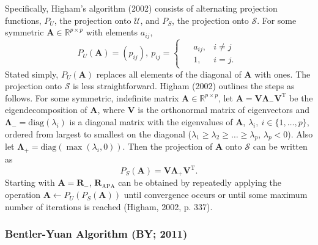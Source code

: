 \documentclass[
  english,
  man]{apa6}
\begin{document}
Specifically, Higham's algorithm (2002) consists of alternating projection functions, \(P_U\), the projection onto \(\mathcal{U}\), and \(P_S\), the projection onto \(\mathcal{S}\). For some symmetric \(\mathbf{A} \in \mathbb{R}^{p \times p}\) with elements \(a_{ij}\),
\begin{equation}
P_U(\mathbf{A}) = (p_{ij}), \: p_{ij} = 
\begin{cases}
\begin{aligned}
&a_{ij}, &i \neq j \\
&1, &i = j.
\end{aligned}
\end{cases}
\label{eq:proj-U}
\end{equation}
Stated simply, \(P_U(\mathbf{A})\) replaces all elements of the diagonal of \(\mathbf{A}\) with ones. The projection onto \(\mathcal{S}\) is less straightforward. Higham (2002) outlines the steps as follows. For some symmetric, indefinite matrix \(\mathbf{A} \in \mathbb{R}^{p \times p}\), let \(\mathbf{A} = \mathbf{V} \mathbf{\Lambda}_- \mathbf{V}^{\textrm{T}}\) be the eigendecomposition of \(\mathbf{A}\), where \(\mathbf{V}\) is the orthonormal matrix of eigenvectors and \(\mathbf{\Lambda_-} = \textrm{diag}(\lambda_i)\) is a diagonal matrix with the eigenvalues of \(\mathbf{A}\), \(\lambda_i, \: i \in \{1, \dots, p \}\), ordered from largest to smallest on the diagonal (\(\lambda_1 \geq \lambda_2 \geq \dots \geq \lambda_p\), \(\lambda_p < 0\)). Also let \(\mathbf{\Lambda}_+ = \textrm{diag}(\max(\lambda_i, 0))\). Then the projection of \(\mathbf{A}\) onto \(\mathcal{S}\) can be written as
\begin{equation}
P_S(\mathbf{A}) = \mathbf{V} \mathbf{\Lambda_+} \mathbf{V}^{\textrm{T}}.
\label{eq:proj-S}
\end{equation}
Starting with \(\mathbf{A} = \mathbf{R}_{-}\), \(\mathbf{R}_{\textrm{APA}}\) can be obtained by repeatedly applying the operation \(\mathbf{A} \leftarrow P_U(P_S(\mathbf{A}))\) until convergence occurs or until some maximum number of iterations is reached (Higham, 2002, p. 337).

\hypertarget{bentler-yuan-algorithm-by-2011}{%
\subsubsection{Bentler-Yuan Algorithm (BY; 2011)}\label{bentler-yuan-algorithm-by-2011}}
\end{document}
